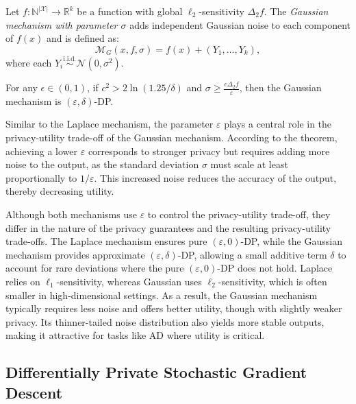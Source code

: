 \begin{definition}\label{def:gaussian}
Let $f : \mathbb{N}^{|\mathcal{X}|} \rightarrow \mathbb{R}^k$ be a function with global $\ell_2$-sensitivity $\Delta_2 f$. The \emph{Gaussian mechanism with parameter $\sigma$} adds independent Gaussian noise to each component of $f(x)$ and is defined as:
\[
\mathcal{M}_G(x, f, \sigma) = f(x) + (Y_1, \ldots, Y_k),
\]
where each $Y_i \overset{\text{i.i.d.}}{\sim} \mathcal{N}(0, \sigma^2)$.
\end{definition}
\begin{theorem}\label{the:gaussian_guarantee}
For any $\epsilon \in (0, 1)$, if $c^2 > 2 \ln(1.25/\delta)$ and $\sigma \geq \frac{c \Delta_2 f}{\varepsilon}$, then the Gaussian mechanism is $(\varepsilon, \delta)$-DP.
\end{theorem}

Similar to the Laplace mechanism, the parameter $\varepsilon$ plays a central role in the privacy-utility trade-off of the Gaussian mechanism. According to the theorem, achieving a lower $\varepsilon$ corresponds to stronger privacy but requires adding more noise to the output, as the standard deviation $\sigma$ must scale at least proportionally to $1/\varepsilon$. This increased noise reduces the accuracy of the output, thereby decreasing utility.

Although both mechanisms use $\varepsilon$ to control the privacy-utility trade-off, they differ in the nature of the privacy guarantees and the resulting privacy-utility trade-offs. The Laplace mechanism ensures pure $(\varepsilon, 0)$-DP, while the Gaussian mechanism provides approximate $(\varepsilon, \delta)$-DP, allowing a small additive term $\delta$ to account for rare deviations where the pure $(\varepsilon, 0)$-DP does not hold. Laplace relies on $\ell_1$-sensitivity, whereas Gaussian uses $\ell_2$-sensitivity, which is often smaller in high-dimensional settings. As a result, the Gaussian mechanism typically requires less noise and offers better utility, though with slightly weaker privacy. Its thinner-tailed noise distribution also yields more stable outputs, making it attractive for tasks like AD where utility is critical.

\subsection{Differentially Private Stochastic Gradient Descent}

